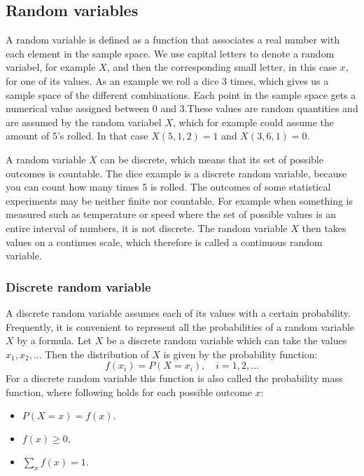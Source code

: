 
\subsection{Random variables}
A random variable is defined as a function that associates a real number with each element in the sample space. We use capital letters to denote a random variabel, for example $X$, and then the corresponding small letter, in this case $x$, for one of its values. As an example we roll a dice 3 times, which gives us a sample space of the different combinations. Each point in the sample space gets a numerical value assigned between 0 and 3.These values are random quantities and are assumed by the random variabel $X$, which for example could assume the amount of 5's rolled. In that case $X(5,1,2) = 1$ and $X(3,6,1) = 0$.
\newline

A random variable $X$ can be discrete, which means that its set of possible outcomes is countable. The dice example is a discrete random variable, because you can count how many times 5 is rolled. The outcomes of some statistical experiments may be neither finite nor countable. For example when something is measured such as temperature or speed where the set of possible values is an entire interval of numbers, it is not discrete. The random variable $X$ then takes values on a continues scale, which therefore is called a continuous random variable.

\subsubsection{Discrete random variable}
A discrete random variable assumes each of its values with a certain probability. Frequently, it is convenient to represent all the probabilities of a random variable $X$ by a formula. Let $X$ be a discrete random variable which can take the values $x_{1}, x_{2},...$ Then the distribution of $X$ is given by the probability function:
$$f(x_{i})=P(X=x_{i}),\quad i=1,2,...$$
\newline
For a discrete random variable this function is also called the probability mass function, where following holds for each possible outcome $x$:

\begin{itemize}
	\item $P(X = x) = f(x).$
	\item $f(x) \geq 0,$
	\item $\sum_x f(x) = 1.$
\end{itemize}

